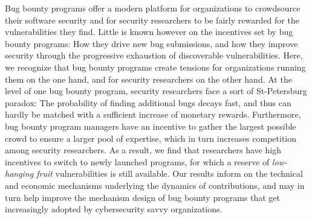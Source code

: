 Bug bounty programs offer a modern platform for organizations to crowdsource their software security and for security researchers to be fairly rewarded for the vulnerabilities they find. Little is known however on the incentives set by bug bounty programs: How they drive new bug submissions, and how they improve security through the progressive exhaustion of discoverable vulnerabilities. Here, we recognize that bug bounty programs create tensions for organizations running them on the one hand, and for security researchers on the other hand. At the level of one bug bounty program, security researchers face a sort of St-Petersburg paradox: The probability of finding additional bugs decays fast, and thus can hardly be matched with a sufficient increase of monetary rewards. Furthermore, bug bounty program managers have an incentive to gather the largest possible crowd to ensure a larger pool of expertise, which in turn increases competition among security researchers. As a result, we find that researchers have high incentives to switch to newly launched programs, for which a reserve of {\it low-hanging fruit} vulnerabilities is still available. Our results inform on the technical and economic mechanisms underlying the dynamics of contributions, and may in turn help improve the mechanism design of bug bounty programs that get increasingly adopted by cybersecurity savvy organizations.